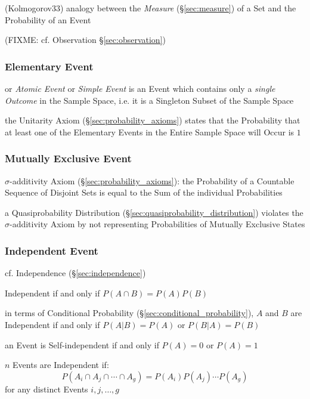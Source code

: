 (Kolmogorov33) analogy between the \emph{Measure} (\S\ref{sec:measure}) of a Set
and the Probability of an Event

(FIXME: cf. Observation \S\ref{sec:observation})



\subsubsection{Elementary Event}\label{sec:elementary_event}

or \emph{Atomic Event} or \emph{Simple Event} is an Event which contains only a
\emph{single Outcome} in the Sample Space, i.e. it is a Singleton Subset of the
Sample Space

the Unitarity Axiom (\S\ref{sec:probability_axioms}) states that the
Probability that at least one of the Elementary Events in the Entire Sample
Space will Occur is $1$



\subsubsection{Mutually Exclusive Event}\label{sec:mutually_exclusive}

$\sigma$-additivity Axiom (\S\ref{sec:probability_axioms}): the Probability of
a Countable Sequence of Disjoint Sets is equal to the Sum of the individual
Probabilities

a Quasiprobability Distribution (\S\ref{sec:quasiprobability_distribution})
violates the $\sigma$-additivity Axiom by not representing Probabilities of
Mutually Exclusive States



\subsubsection{Independent Event}\label{sec:independent_event}

\fist cf. Independence (\S\ref{sec:independence})

Independent if and only if $P(A \cap B) = P(A) P(B)$

in terms of Conditional Probability (\S\ref{sec:conditional_probability}), $A$
and $B$ are Independent if and only if $P(A|B) = P(A)$ or $P(B|A) = P(B)$

an Event is Self-independent if and only if $P(A) = 0$ or $P(A) = 1$

$n$ Events are Independent if:
\[
  P(A_i \cap A_j \cap \cdots \cap A_g) = P(A_i)P(A_j) \cdots P(A_g)
\]
for any distinct Events $i,j,\ldots,g$

